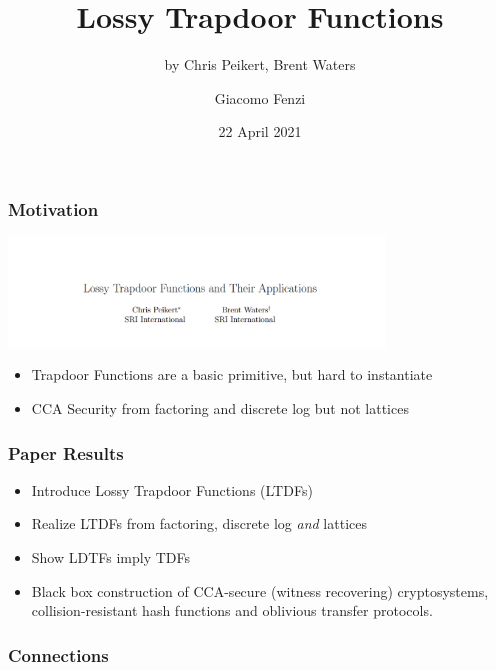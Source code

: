 \documentclass{beamer}
\title{Lossy Trapdoor Functions}
\subtitle{by Chris Peikert, Brent Waters}
\author{Giacomo Fenzi}
\institute{ETH Zurich}
\date{22 April 2021}
\begin{document}
\frame{\titlepage}

\begin{frame}
    \frametitle{Motivation}
    \begin{center}
        \includegraphics[width=10cm]{intro.PNG}
    \end{center}
    \begin{itemize}
        \item Trapdoor Functions are a basic primitive, but hard to instantiate
        \item CCA Security from factoring and discrete log but not lattices
    \end{itemize}


\end{frame}


\begin{frame}
    \frametitle{Paper Results}
    \begin{itemize}
        \item Introduce Lossy Trapdoor Functions (LTDFs)
        \item Realize LTDFs from factoring, discrete log \textit{and} lattices
        \item Show LDTFs imply TDFs
        \item Black box construction of CCA-secure (witness recovering) cryptosystems,
              collision-resistant hash functions and oblivious transfer protocols.
    \end{itemize}
\end{frame}

\begin{frame}
    \frametitle{Connections}
    \begin{center}
    \end{center}
\end{frame}
\end{document}
